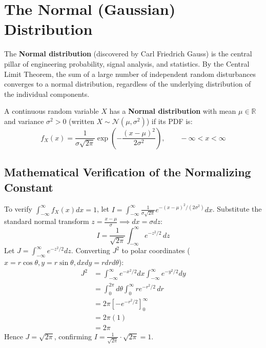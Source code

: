 \documentclass[12pt,a4paper]{article}
\begin{document}
\pagebreak[3]
\section{The Normal (Gaussian) Distribution}

The \textbf{Normal distribution} (discovered by Carl Friedrich Gauss) is the central pillar of engineering probability, signal analysis, and statistics. By the Central Limit Theorem, the sum of a large number of independent random disturbances converges to a normal distribution, regardless of the underlying distribution of the individual components.

\begin{tcolorbox}[defbox, title={\textbf{Definition: Normal Distribution $\mathcal{N}(\mu, \sigma^2)$}}]
A continuous random variable $X$ has a \textbf{Normal distribution} with mean $\mu \in \mathbb{R}$ and variance $\sigma^2 > 0$ (written $X \sim \mathcal{N}(\mu, \sigma^2)$) if its PDF is:
\begin{equation}
  f_X(x) = \frac{1}{\sigma\sqrt{2\pi}} \exp\left(-\frac{(x - \mu)^2}{2\sigma^2}\right), \qquad -\infty < x < \infty
\end{equation}
\end{tcolorbox}

\subsection{Mathematical Verification of the Normalizing Constant}
To verify $\int_{-\infty}^\infty f_X(x) dx = 1$, let $I = \int_{-\infty}^\infty \frac{1}{\sigma\sqrt{2\pi}} e^{-(x-\mu)^2/(2\sigma^2)} dx$.
Substitute the standard normal transform $z = \frac{x - \mu}{\sigma} \implies dx = \sigma dz$:
\begin{equation}
  I = \frac{1}{\sqrt{2\pi}} \int_{-\infty}^\infty e^{-z^2/2} \, dz
\end{equation}
Let $J = \int_{-\infty}^\infty e^{-z^2/2} dz$. Converting $J^2$ to polar coordinates ($x = r\cos\theta, y = r\sin\theta, dx dy = r dr d\theta$):
\begin{equation}
  \begin{aligned}
    J^2 &= \int_{-\infty}^\infty e^{-x^2/2} dx \int_{-\infty}^\infty e^{-y^2/2} dy \\[3pt]
    &= \int_0^{2\pi} d\theta \int_0^\infty r e^{-r^2/2} \, dr \\[3pt]
    &= 2\pi \left[-e^{-r^2/2}\right]_0^\infty \\[3pt]
    &= 2\pi(1) \\[3pt]
    &= 2\pi
  \end{aligned}
\end{equation}
Hence $J = \sqrt{2\pi}$, confirming $I = \frac{1}{\sqrt{2\pi}} \cdot \sqrt{2\pi} = 1$.
\end{document}
